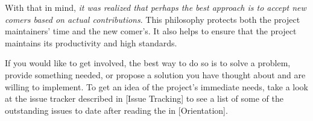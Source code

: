 With that in mind, {\it it was realized that perhaps the best approach is to accept new comers based on actual contributions}. This philosophy protects both the project maintainers' time and the new comer's. It also helps to ensure that the project maintains its productivity and high standards. 

If you would like to get involved, the best way to do so is to solve a problem, provide something needed, or propose a solution you have thought about and are willing to implement. To get an idea of the project's immediate needs, take a look at the issue tracker described in [Issue Tracking] to see a list of some of the outstanding issues to date after reading the \about[Orientation] in [Orientation].

